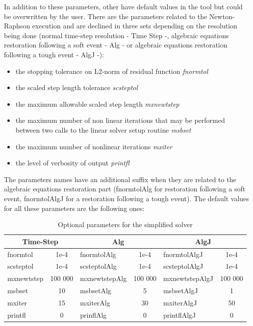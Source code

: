 \documentclass[a4paper, 12pt]{report}
\begin{document}
In addition to these parameters, other have default values in the tool but could be overwritten by the user. There are the parameters related to the Newton-Raphson execution and are declined in three sets depending on the resolution being done (normal time-step resolution - Time Step -, algebraic equations restoration following a soft event - Alg - or algebraic equations restoration following a tough event - AlgJ -):
\begin{itemize}
\item the stopping tolerance on L2-norm of residual function \textit{fnormtol}
\item the scaled step length tolerance \textit{scsteptol}
\item the maximum allowable scaled step length \textit{mxnewtstep}
\item the maximum number of non linear iterations that may be performed between two calls to the linear solver setup routine \textit{msbset}
\item the maximum number of nonlinear iterations \textit{mxiter}
\item the level of verbosity of output \textit{printfl}
\end{itemize}

The parameters names have an additional suffix when they are related to the algebraic equations restoration part (fnormtolAlg for restoration following a soft event, fnormtolAlgJ for a restoration following a tough event). The default values for all these parameters are the following ones:

\begin{table}[h!]
\center
\begin{tabular}{lc | lc | lc}
\toprule
\multicolumn{2}{c}{\textbf{Time-Step}} &
\multicolumn{2}{c}{\textbf{Alg}} &
\multicolumn{2}{c}{\textbf{AlgJ}} \\
\midrule
fnormtol & 1e-4 & fnormtolAlg & 1e-4 & fnormtolAlgJ & 1e-4 \\
scsteptol & 1e-4 & scsteptolAlg & 1e-4 & scsteptolAlgJ & 1e-4 \\
mxnewtstep & 100 000 & mxnewtstepAlg & 100 000 & mxnewtstepAlgJ & 100 000 \\
msbset & 10 & msbsetAlg & 5 & msbsetAlgJ & 1 \\
mxiter & 15 & mxiterAlg & 30 & mxiterAlgJ & 50 \\
printfl & 0 & prinflAlg & 0 & printflAlgJ & 0 \\
\bottomrule
\end{tabular}
\caption{Optional parameters for the simplified solver}
\label{OptionalParameters}
\end{table}
\end{document}
